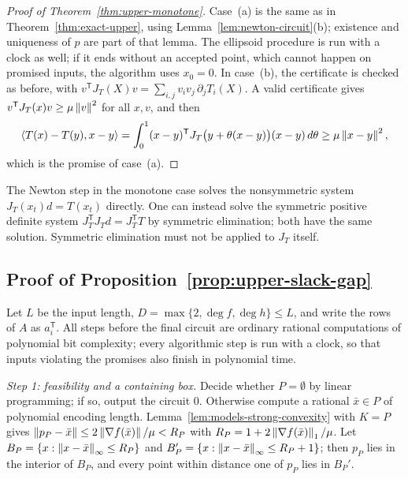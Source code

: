 \label{app:upper-monotone-proof}
\begin{proof}[Proof of Theorem~\ref{thm:upper-monotone}]
Case~(a) is the same as in Theorem~\ref{thm:exact-upper}, using
Lemma~\ref{lem:newton-circuit}(b); existence and uniqueness of $p$ are part
of that lemma. The ellipsoid procedure is run with a clock as well; if it
ends without an accepted point, which cannot happen on promised inputs, the
algorithm uses $x_0=0$. In case~(b), the certificate is checked as before, with
$v^{\mathsf T}J_T(X)v=\sum_{i,j}v_iv_j\,\partial_jT_i(X)$. A valid certificate
gives $v^{\mathsf T}J_T(x)v\ge\mu\left\lVert v\right\rVert^2$ for all $x,v$, and then
\[
 \left\langle T(x)-T(y),x-y\right\rangle
 =\int_0^1(x-y)^{\mathsf T}J_T\bigl(y+\theta(x-y)\bigr)(x-y)\,d\theta
 \ge\mu\left\lVert x-y\right\rVert^2 ,
\]
which is the promise of case~(a).
\end{proof}

The Newton step in the monotone case solves the nonsymmetric system
$J_T(x_t)d=T(x_t)$ directly. One can instead solve the symmetric positive
definite system $J_T^{\mathsf T}J_Td=J_T^{\mathsf T}T$ by symmetric
elimination; both have the same solution. Symmetric elimination must not be
applied to $J_T$ itself.

\subsection{Proof of Proposition~\ref{prop:upper-slack-gap}}
\label{app:upper-slack}

Let $L$ be the input length, $D=\max\{2,\deg f,\deg h\}\le L$, and write the
rows of $A$ as $a_i^{\mathsf T}$. All steps before the final circuit are
ordinary rational computations of polynomial bit complexity; every
algorithmic step is run with a clock, so that inputs violating the promises
also finish in polynomial time.

\emph{Step 1: feasibility and a containing box.} Decide whether
$P=\emptyset$ by linear programming; if so, output the circuit $0$. Otherwise
compute a rational $\bar x\in P$ of polynomial encoding length.
Lemma~\ref{lem:models-strong-convexity} with $K=P$ gives
$\left\lVert p_P-\bar x\right\rVert\le2\left\lVert\nabla f(\bar x)\right\rVert/\mu<R_P$ with
$R_P=1+2\left\lVert\nabla f(\bar x)\right\rVert_1/\mu$. Let
$B_P=\{x:\left\lVert x-\bar x\right\rVert_\infty\le R_P\}$ and
$B_P'=\{x:\left\lVert x-\bar x\right\rVert_\infty\le R_P+1\}$; then $p_P$ lies in the interior
of $B_P$, and every point within distance one of $p_P$ lies in $B_P'$.


